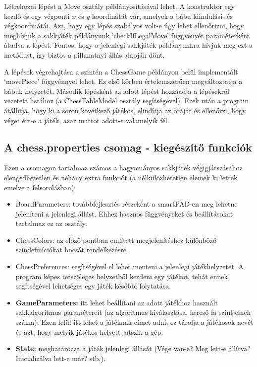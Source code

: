\documentclass[../documentation.tex]{subfiles}
\begin{document}
Létrehozni lépést a Move osztály példányosításával lehet. A konstruktor egy kezdő és egy végponti $x$ és $y$ koordinátát vár, amelyek a bábu kiindulási- és végkoordinátái. Azt, hogy egy lépés szabályos volt-e úgy lehet ellenőrizni, hogy meghívjuk a sakkjáték példányunk `checkIfLegalMove' függvényét paraméterként átadva a lépést. Fontos, hogy a jelenlegi sakkjáték példányunkra hívjuk meg ezt a metódust, így biztos a pillanatnyi állás alapján dönt.

A lépések végrehajtása a szintén a ChessGame példányon belül implementált `movePiece' függvénnyel lehet. Ez első körben értelemszerűen megváltoztatja a bábuk helyzetét. Második lépésként az adott lépést hozzáadja a lépésekről vezetett listához (a ChessTableModel osztály segítségével). Ezek után a program átállítja, hogy ki a soron következő játékos, elindítja az óráját és ellenőrzi, hogy véget ért-e a játék, azaz mattot adott-e valamelyik fél.


\subsection{A chess.properties csomag - kiegészítő funkciók}
Ezen a csomagon tartalmaz számos a hagyományos sakkjáték végigjátszásához elengedhetetlen és néhány extra funkciót (a nélkülözhetetlen elemek ki lettek emelve a felsorolásban):

\begin{itemize}
	\item BoardParameters: továbbfejlesztés részeként a smartPAD-en meg lehetne jeleníteni a jelenlegi állást. Ehhez hasznos függvényeket és beállításokat tartalmaz ez az osztály.
	\item ChessColors: az előző pontban említett megjelenítéshez különböző színdefiníciókat bocsát rendelkezésre.
	\item ChessPreferences: segítségével el lehet menteni a jelenlegi játékhelyzetet. A program képes tetszőleges helyzetből kezdeni egy játékot, tehát ennek segítségével lehetséges egy játék későbbi folytatása.
	\item \textbf{GameParameters:} itt lehet beállítani az adott játékhoz használt sakkalgoritmus paramétereit (az algoritmus kiválasztása, kereső fa szintjeinek száma). Ezen felül itt lehet a játéknak címet adni, ez tárolja a játékosok nevét és azt, hogy melyik játékos helyett játszik a gép.
	\item \textbf{State:} meghatározza a játék jelenlegi állását (Vége van-e? Meg lett-e állítva? Inicializálva lett-e már? stb.).
\end{itemize}
\end{document}
